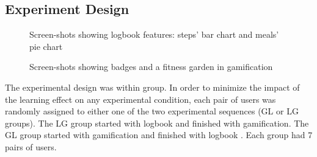 \documentclass{sig-alternate}
\begin{document}
\subsection{Experiment Design}
\begin{figure}
\centering
{}
\caption{Screen-shots showing logbook features: steps' bar chart and meals' pie chart}
\label{figure:logbookapp}
\end{figure}
\begin{figure}
\centering
{}
\caption{Screen-shots showing badges and a fitness garden in gamification}
\label{figure:gameapp}
\end{figure}   
The experimental design was within group. In order to minimize the impact of the learning effect on any experimental condition, each pair of users was randomly assigned to either one of the two experimental sequences (GL or LG groups). The LG group started with logbook and finished with gamification. The  GL group started with gamification and finished with logbook . Each group had 7 pairs of users. 
\end{document}

